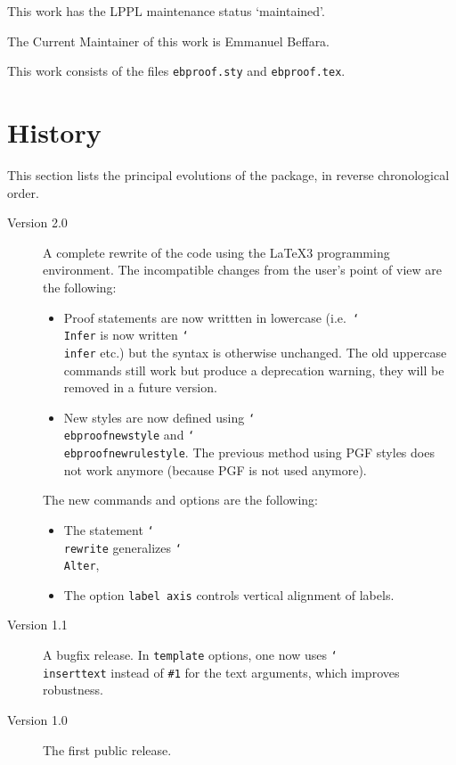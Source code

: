 \documentclass{article}
\newcommand\lit[1]{\texttt{#1}}
\newcommand\cs[1]{\lit{\char`\\#1}}
\newcommand\opt[1]{\lit{#1}}
\begin{document}
This work has the LPPL maintenance status `maintained'.

The Current Maintainer of this work is Emmanuel Beffara.

This work consists of the files \texttt{ebproof.sty} and \texttt{ebproof.tex}.


\section{History}

This section lists the principal evolutions of the package, in reverse
chronological order.
\begin{description}
\item[Version 2.0]
  A complete rewrite of the code using the \LaTeX3 programming environment. 
  The incompatible changes from the user's point of view are the following:
  \begin{itemize}
  \item Proof statements are now writtten in lowercase ({i.e.} \cs{Infer} is
    now written \cs{infer} etc.) but the syntax is otherwise unchanged.
    The old uppercase commands still work but produce a deprecation warning,
    they will be removed in a future version.
  \item New styles are now defined using \cs{ebproofnewstyle} and
    \cs{ebproofnewrulestyle}. The previous method using PGF styles does not
    work anymore (because PGF is not used anymore).
  \end{itemize}
  The new commands and options are the following:
  \begin{itemize}
  \item The statement \cs{rewrite} generalizes \cs{Alter},
  \item The option \opt{label axis} controls vertical alignment of labels.
  \end{itemize}
\item[Version 1.1]
  A bugfix release.
  In \opt{template} options, one now uses \cs{inserttext} instead of \lit{\#1}
  for the text arguments, which improves robustness.
\item[Version 1.0]
  The first public release.
\end{description}
\end{document}
